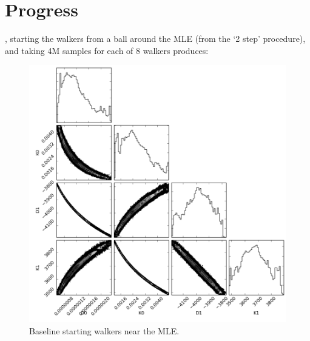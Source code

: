 \documentclass{tufte-handout}
\begin{document}
\section{Progress}
, starting the walkers from a ball
around the MLE (from the `2 step' procedure), and taking 4M samples
for each of 8 walkers produces:
\begin{figure}
\includegraphics[width=\columnwidth]{figs/step_1_4M_2exp.png}
  \caption{Baseline starting walkers near the MLE.}
  \label{fig:baseline}
\end{figure}
\end{document}
